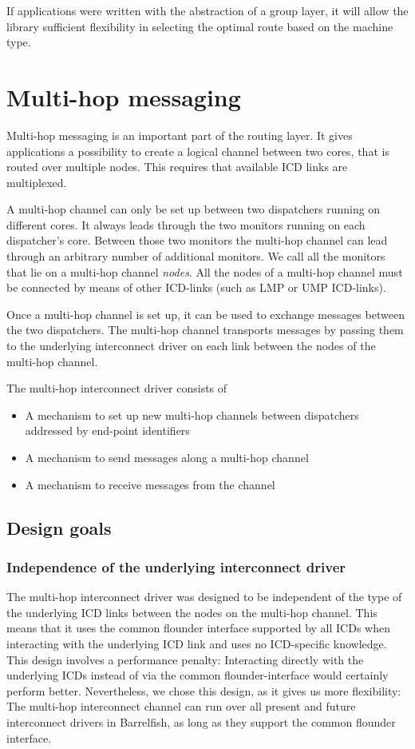 \documentclass[a4paper,twoside]{report} %
\begin{document}
If applications were written with the abstraction of a group layer,
it will allow the library sufficient flexibility in
selecting the optimal route based on the machine type.


\chapter{Multi-hop messaging}

Multi-hop messaging is an important part of the routing layer. It gives applications a possibility to create a logical channel between two cores, that is routed over multiple nodes. This requires that available ICD links are multiplexed.

A multi-hop channel can only be set up between two dispatchers running on different cores. It always leads through the two monitors running on each dispatcher's core. Between those two monitors the multi-hop channel can lead through an arbitrary number of additional monitors. We call all the monitors that lie on a multi-hop channel \emph{nodes}. All the nodes of a multi-hop channel must be connected by means of other ICD-links (such as LMP or UMP ICD-links).

Once a multi-hop channel is set up, it can be used to exchange messages between the two dispatchers. The multi-hop channel transports messages by passing them to the underlying interconnect driver on each link between the nodes of the multi-hop channel. 

The multi-hop interconnect driver consists of
\begin{itemize}
\item A mechanism to set up new multi-hop channels between dispatchers addressed by end-point identifiers
\item A mechanism to send messages along a multi-hop channel
\item A mechanism to receive messages from the channel
\end{itemize}


\section{Design goals}

\subsection{Independence of the underlying interconnect driver}

The multi-hop interconnect driver was designed to be independent of the type of the underlying ICD links between the nodes on the multi-hop channel. This means that it uses the common flounder interface supported by all ICDs when interacting with the underlying ICD link and uses no ICD-specific knowledge. This design involves a performance penalty: Interacting directly with the underlying ICDs instead of via the common flounder-interface would certainly perform better. Nevertheless, we chose this design, as it gives us more flexibility: The multi-hop interconnect channel can run over all present and future interconnect drivers in Barrelfish, as long as they support the common flounder interface.
\end{document}
